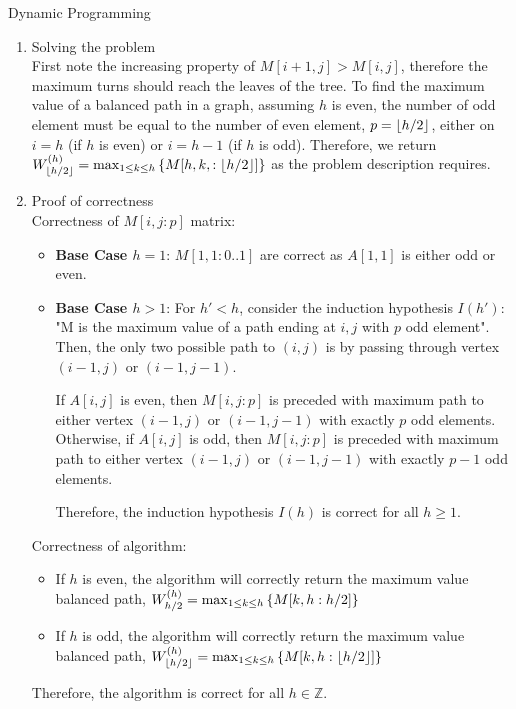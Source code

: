 \documentclass{article}
\numberwithin{table}{section}
\numberwithin{figure}{section}
\begin{document}
\begin{section}{Dynamic Programming}
\begin{enumerate}
\begin{tcolorbox}[breakable]
\begin{enumerate}
            \item Solving the problem \\
            First note the increasing property of $M[i+1, j] > M[i, j]$, therefore the maximum turns should reach the leaves of the tree. 
            To find the maximum value of a balanced path in a graph, assuming $h$ is even, the number of odd element must be equal to the number of even element, $p = \lfloor h/2\rfloor$, either on $i = h$ (if $h$ is even) or $i = h-1$ (if $h$ is odd). Therefore, we return $W_{\lfloor h/2\rfloor}^{\left(h\right)} = \max_{1 \leq k \leq h}\left\{M[h, k, : \lfloor h/2\rfloor]\right\}$ as the problem description requires.
            
            \item Proof of correctness \\
            Correctness of $M[i,j : p]$ matrix:
            \begin{itemize}
                \item \textbf{Base Case $h=1$}: $M[1,1 : 0..1]$ are correct as $A[1,1]$ is either odd or even. 
                \item \textbf{Base Case $h>1$}: For $h' < h$, consider the induction hypothesis $I(h')$: "M is the maximum value of a path ending at $i, j$ with $p$ odd element". Then, the only two possible path to $(i,j)$ is by passing through vertex $(i-1, j)$ or $(i-1 , j-1)$.
                
                If $A[i, j]$ is even, then $M[i,j : p]$ is preceded with maximum path to either vertex $(i-1, j)$ or $(i-1 , j-1)$ with exactly $p$ odd elements. 
                Otherwise, if $A[i,j]$ is odd, then $M[i,j : p]$ is preceded with maximum path to either vertex $(i-1, j)$ or $(i-1 , j-1)$ with exactly $p-1$ odd elements. 

                Therefore, the induction hypothesis $I(h)$ is correct for all $h \geq 1$.
            \end{itemize}
            Correctness of algorithm: 
            \begin{itemize}
                \item If $h$ is even, the algorithm will correctly return the maximum value balanced path, $W_{h/2}^{\left(h\right)} = \max_{1 \leq k \leq h}\left\{M[k, h : h/2]\right\}$
                \item If $h$ is odd, the algorithm will correctly return the maximum value balanced path, $W_{\lfloor h/2\rfloor}^{\left(h\right)} = \max_{1 \leq k \leq h}\left\{M[k, h : \lfloor h/2\rfloor]\right\}$
            \end{itemize}
            Therefore, the algorithm is correct for all $h \in \mathbb{Z}$.
            

\end{enumerate}
\end{tcolorbox}
\end{enumerate}
\end{section}
\end{document}
